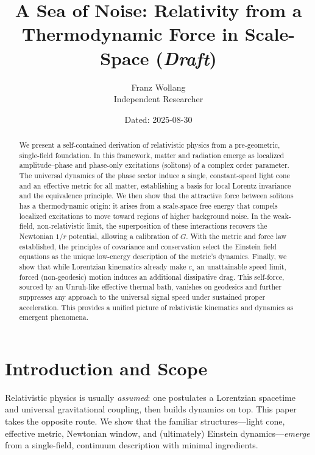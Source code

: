 \documentclass[11pt]{article}
\title{A Sea of Noise: Relativity from a Thermodynamic Force in Scale-Space (\textit{Draft})}
\author{Franz Wollang\\ \small Independent Researcher}
\date{\small Dated: 2025-08-30}
\begin{document}
\maketitle

\begin{center}
\setlength{\fboxsep}{8pt}%
\end{center}
\vspace{1em}

\begin{abstract}
We present a self-contained derivation of relativistic physics from a pre-geometric, single-field foundation. In this framework, matter and radiation emerge as localized amplitude--phase and phase-only excitations (solitons) of a complex order parameter. The universal dynamics of the phase sector induce a single, constant-speed light cone and an effective metric for all matter, establishing a basis for local Lorentz invariance and the equivalence principle. We then show that the attractive force between solitons has a thermodynamic origin: it arises from a scale-space free energy that compels localized excitations to move toward regions of higher background noise. In the weak-field, non-relativistic limit, the superposition of these interactions recovers the Newtonian $1/r$ potential, allowing a calibration of $G$. With the metric and force law established, the principles of covariance and conservation select the Einstein field equations as the unique low-energy description of the metric's dynamics. Finally, we show that while Lorentzian kinematics already make $c_s$ an unattainable speed limit, forced (non-geodesic) motion induces an additional dissipative drag. This self-force, sourced by an Unruh-like effective thermal bath, vanishes on geodesics and further suppresses any approach to the universal signal speed under sustained proper acceleration. This provides a unified picture of relativistic kinematics and dynamics as emergent phenomena.
\end{abstract}

\section{Introduction and Scope}
Relativistic physics is usually \emph{assumed}: one postulates a Lorentzian spacetime and universal gravitational coupling, then builds dynamics on top. This paper takes the opposite route. We show that the familiar structures—light cone, effective metric, Newtonian window, and (ultimately) Einstein dynamics—\emph{emerge} from a single-field, continuum description with minimal ingredients.
\end{document}
